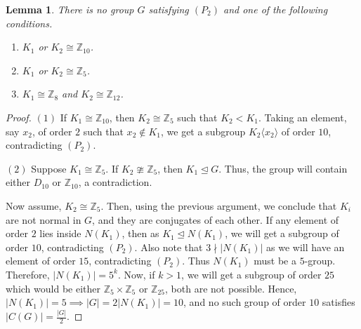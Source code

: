 \documentclass[a4paper,11pt]{amsart}
\numberwithin{equation}{section}
\numberwithin{equation}{subsection}
\newtheorem{lemma}[theorem]{Lemma}
\begin{document}
\begin{lemma}\label{lemma5}
   There is no group $G$ satisfying $(P_2)$ and one of the following conditions.
   \begin{enumerate}
\item $K_1$ or $K_2 \cong \mathbb Z_{10}$.

\item $K_1$ or $K_2 \cong \mathbb Z_{5}$.



        \item $K_1 \cong \mathbb{Z}_{8}$ and $K_2 \cong \mathbb{Z}_{12}$.


   \end{enumerate}
\end{lemma}
\begin{proof} 
$(1)$ If $K_1\cong \mathbb{Z}_{10}$, then $K_2\cong \mathbb{Z}_5$ such that $K_2 < K_1$. Taking an element, say $x_2$, of order $2$ such that $x_2\notin K_1$, we get a subgroup $K_2\langle x_2\rangle $ of order $10$, contradicting $(P_2)$.

    
    $(2)$ Suppose $K_1\cong \mathbb{Z}_5$. If $K_2\ncong \mathbb{Z}_5$, then $K_1\trianglelefteq G$. Thus, the group will contain either $D_{10}$ or $\mathbb{Z}_{10}$, a contradiction.
    

    Now assume, $K_2\cong \mathbb{Z}_5$. Then, using the previous argument, we conclude that $K_i$ are not normal in $G$, and they are conjugates of each other. 
    If any element of order $2$ lies inside $N(K_1)$, then as $K_1\trianglelefteq N(K_1)$, we will get a subgroup of order $10$,  contradicting $(P_2)$. Also note that $3 \nmid |N(K_1)|$ as we will have an element of order $15$, contradicting $(P_{2})$. Thus $N(K_1)$ must be a $5$-group. Therefore, $|N(K_1)| = 5^k$. 
    Now, if $k>1$, we will get a subgroup of order $25$ which would be either $\mathbb{Z}_5\times \mathbb{Z}_5$ or $\mathbb{Z}_{25}$, both are not possible. Hence, $|N(K_1)| = 5 \implies |G| = 2|N(K_1)| = 10$, and no such group of order $10$ satisfies $|C(G)| = \frac{|G|}{2}$.


\end{proof}
\end{document}
